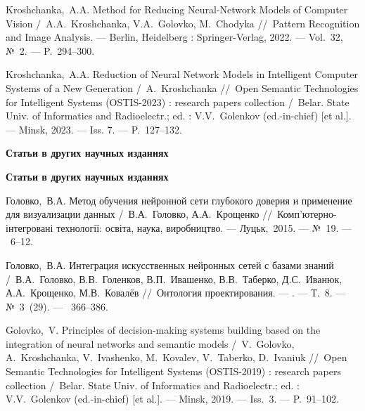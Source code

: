Kroshchanka,~A.A. Method for Reducing Neural-Network Models of Computer Vision /~A.A.~Kroshchanka, V.A.~Golovko, M.~Chodyka
\newblock //~Pattern Recognition and Image Analysis. ---
\newblock Berlin, Heidelberg : Springer-Verlag, 2022. ---
\newblock Vol.~32, №~2. ---
\newblock P.~294--300.

Kroshchanka,~A.A. Reduction of Neural Network Models in Intelligent Computer Systems of a New Generation /~A.~Kroshchanka
\newblock //~Open Semantic Technologies for Intelligent Systems (OSTIS-2023) : research papers collection
\newblock /~Belar. State Univ. of Informatics and Radioelectr.; ed. : V.V.~Golenkov (ed.-in-chief) [et al.]. ---
\newblock Minsk, 2023. ---
\newblock Iss. 7. ---
\newblock P.~127--132.

\ifx\isabstract\undefined 
\begin{center}
\vspace{3mm}
{\bf Статьи в других научных изданиях}
\vspace{3mm}
\end{center}
\else
\vspace{2mm}
{\bf Статьи в других научных изданиях}
\vspace{2mm}
\fi

Головко,~В.А. Метод обучения нейронной сети глубокого доверия и применение для визуализации данных /~В.А.~Головко, А.А.~Крощенко
\newblock //~Комп'ютерно-інтегровані технології: освіта, наука, виробництво. ---
\newblock \mbox{Луцьк},~2015. ---
\newblock №~19. ---
~6--12.

Головко,~В.А. Интеграция искусственных нейронных сетей с базами знаний /~В.А.~Головко, В.В.~Голенков, В.П.~Ивашенко, В.В.~Таберко, Д.С.~Иванюк, А.А.~Крощенко, М.В.~Ковалёв
\newblock //~Онтология проектирования. ---
. ---
\newblock Т.~8. ---
\newblock №~3~(29). ---
~366--386.

Golovko,~V. Principles of decision-making systems building based on the integration of neural networks and semantic models /~V.~Golovko, A.~Kroshchanka, V.~Ivashenko, M.~Kovalev, V.~Taberko, D.~Ivaniuk
\newblock //~Open Semantic Technologies for Intelligent Systems (OSTIS-2019) : research papers collection
\newblock /~Belar. State Univ. of Informatics and Radioelectr.; ed. : V.V.~Golenkov (ed.-in-chief) [et al.]. ---
\newblock Minsk, 2019. ---
\newblock Iss.~3. ---
\newblock P.~91--102.

